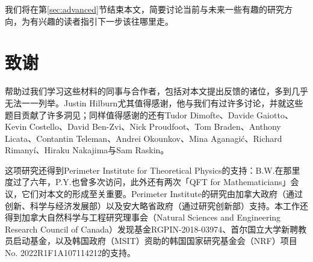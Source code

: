 我们将在第\ref{sec:advanced}节结束本文，简要讨论当前与未来一些有趣的研究方向，为有兴趣的读者指引下一步该往哪里走。

\section*{致谢}

帮助过我们学习这些材料的同事与合作者，包括对本文提出反馈的诸位，多到几乎无法一一列举。Justin Hilburn尤其值得感谢，他与我们有过许多讨论，并就这些题目贡献了许多洞见；同样值得感谢的还有Tudor Dimofte、Davide Gaiotto、Kevin Costello、David Ben-Zvi、Nick Proudfoot、Tom Braden、Anthony Licata、Contantin Teleman、Andrei Okounkov、Mina Aganagi\'c、Richard Rimany\'i、Hiraku Nakajima与Sam Raskin。

这项研究还得到Perimeter Institute for Theoretical Physics的支持：B.W.在那里度过了六年，P.Y.也曾多次访问，此外还有两次「QFT for Mathematicians」会议，它们对本文的形成至关重要。Perimeter Institute的研究由加拿大政府（通过创新、科学与经济发展部）以及安大略省政府（通过研究创新部）支持。本工作还得到加拿大自然科学与工程研究理事会（Natural Sciences and Engineering Research Council of Canada）发现基金RGPIN-2018-03974、首尔国立大学新聘教员启动基金，以及韩国政府（MSIT）资助的韩国国家研究基金会（NRF）项目No. 2022R1F1A107114212的支持。

